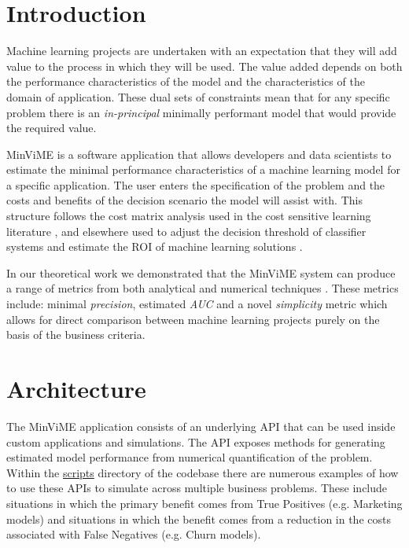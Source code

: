 \documentclass[preprint,12pt, a4paper]{elsarticle}
\begin{document}

\noindent

\section{Introduction}

Machine learning projects are undertaken with an expectation
that they will add value to the process in which they will be used.
The value added depends on both the performance characteristics of the model
and the characteristics of the domain of application. These dual sets
of constraints mean that for any specific problem there is an
{\it in-principal} minimally performant model that would provide the required
value.

MinViME is a software application that allows developers and data scientists
to estimate the minimal performance characteristics of a machine learning
model for a specific application. The user enters the specification of the problem
and the costs and benefits of the decision scenario the model will assist with.
This structure follows the cost matrix analysis used in the cost sensitive learning
literature \cite{Domingos1999,Margineantu2000,Elkan2001,Tian+Zhang2019}, and
elsewhere used to adjust the decision threshold of classifier systems \cite{Nikolaou2016}
and estimate the ROI of machine learning solutions \cite{Ylijoki2018}.
 
In our theoretical work we demonstrated that the MinViME system can produce a range of metrics 
from both analytical and numerical techniques \cite{Hawkins2020}. These metrics include: 
minimal \textit{precision}, estimated \textit{AUC} and a novel \textit{simplicity}  
metric which allows for direct comparison between machine learning projects purely 
on the basis of the business criteria.

\section{Architecture}

The MinViME application consists of an underlying API that can be used inside custom
applications and simulations. The API exposes methods for generating estimated model
performance from numerical quantification of the problem. Within the 
\href{https://github.com/john-hawkins/minvime/tree/master/scripts}{scripts} directory
of the codebase there are numerous examples of how to use these APIs to simulate across
multiple business problems. These include situations in which the primary benefit comes
from True Positives (e.g. Marketing models) and situations in which the benefit comes from
a reduction in the costs associated with False Negatives (e.g. Churn models).
\end{document}
